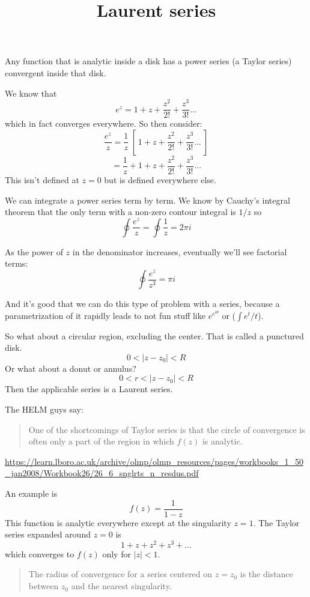 \documentclass[11pt, oneside]{article}
\title{Laurent series}
\date{}
\begin{document}
 
\maketitle
\Large


Any function that is analytic inside a disk has a power series (a Taylor series) convergent inside that disk.  

We know that
\[ e^z = 1 + z + \frac{z^2}{2!} + \frac{z^3}{3!} \dots \]
which in fact converges everywhere.  So then consider:
\[ \frac{e^z}{z} = \frac{1}{z} \ [ \ 1 + z + \frac{z^2}{2!} + \frac{z^3}{3!} \dots \ ] \]
\[ = \frac{1}{z} + 1 + z + \frac{z^2}{2!} + \frac{z^3}{3!} \dots \]
This isn't defined at $z = 0$ but is defined everywhere else.

We can integrate a power series term by term.  We know by Cauchy's integral theorem that the only term with a non-zero contour integral is $1/z$ so
\[ \oint \frac{e^z}{z} = \oint \frac{1}{z} = 2 \pi i \]

As the power of $z$ in the denominator increases, eventually we'll see factorial terms:
\[ \oint \frac{e^z}{z^3} = \pi i \]

And it's good that we can do this type of problem with a series, because a parametrization of it rapidly leads to not fun stuff like $e^{e^{i \theta}}$ or ($\int e^t/t$).

So what about a circular region, excluding the center.  That is called a punctured disk.
\[ 0 < |z-z_0| < R \]
Or what about a donut or annulus?
\[ 0 < r < |z-z_0| < R \]
Then the applicable series is a Laurent series.

The HELM guys say: 
\begin{quote}One of the shortcomings of Taylor series is that the circle of convergence is often only a part of the region in which $f(z)$ is analytic.\end{quote}

\url{https://learn.lboro.ac.uk/archive/olmp/olmp_resources/pages/workbooks_1_50_jan2008/Workbook26/26_6_snglrts_n_resdus.pdf}

An example is
\[ f(z) = \frac{1}{1 - z} \]
This function is analytic everywhere except at the singularity $z = 1$.  The Taylor series expanded around $z = 0$ is
\[ 1 + z + z^2 + z^3 + \dots \]
which converges to $f(z)$ only for $|z| < 1$.

\begin{quote}The radius of convergence for a series centered on $z = z_0$ is the distance between $z_0$ and the nearest singularity.\end{quote}
\end{document}
